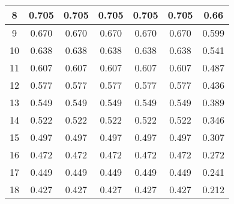 \begin{table}
\begin{tabular}{|l|l|l|l|l|l|l|}
\hline
\multicolumn{1}{|c|}{8} & \multicolumn{1}{c|}{0.705} & \multicolumn{1}{c|}{0.705} & \multicolumn{1}{c|}{0.705} & \multicolumn{1}{c|}{0.705} & \multicolumn{1}{c|}{0.705} & \multicolumn{1}{c|}{0.66} \\ 
\hline
\multicolumn{1}{|c|}{9} & \multicolumn{1}{c|}{0.670} & \multicolumn{1}{c|}{0.670} & \multicolumn{1}{c|}{0.670} & \multicolumn{1}{c|}{0.670} & \multicolumn{1}{c|}{0.670} & \multicolumn{1}{c|}{0.599} \\ 
\hline
\multicolumn{1}{|c|}{10} & \multicolumn{1}{c|}{0.638} & \multicolumn{1}{c|}{0.638} & \multicolumn{1}{c|}{0.638} & \multicolumn{1}{c|}{0.638} & \multicolumn{1}{c|}{0.638} & \multicolumn{1}{c|}{0.541} \\ 
\hline
\multicolumn{1}{|c|}{11} & \multicolumn{1}{c|}{0.607} & \multicolumn{1}{c|}{0.607} & \multicolumn{1}{c|}{0.607} & \multicolumn{1}{c|}{0.607} & \multicolumn{1}{c|}{0.607} & \multicolumn{1}{c|}{0.487} \\ 
\hline
\multicolumn{1}{|c|}{12} & \multicolumn{1}{c|}{0.577} & \multicolumn{1}{c|}{0.577} & \multicolumn{1}{c|}{0.577} & \multicolumn{1}{c|}{0.577} & \multicolumn{1}{c|}{0.577} & \multicolumn{1}{c|}{0.436} \\ 
\hline
\multicolumn{1}{|c|}{13} & \multicolumn{1}{c|}{0.549} & \multicolumn{1}{c|}{0.549} & \multicolumn{1}{c|}{0.549} & \multicolumn{1}{c|}{0.549} & \multicolumn{1}{c|}{0.549} & \multicolumn{1}{c|}{0.389} \\ 
\hline
\multicolumn{1}{|c|}{14} & \multicolumn{1}{c|}{0.522} & \multicolumn{1}{c|}{0.522} & \multicolumn{1}{c|}{0.522} & \multicolumn{1}{c|}{0.522} & \multicolumn{1}{c|}{0.522} & \multicolumn{1}{c|}{0.346} \\ 
\hline
\multicolumn{1}{|c|}{15} & \multicolumn{1}{c|}{0.497} & \multicolumn{1}{c|}{0.497} & \multicolumn{1}{c|}{0.497} & \multicolumn{1}{c|}{0.497} & \multicolumn{1}{c|}{0.497} & \multicolumn{1}{c|}{0.307} \\ 
\hline
\multicolumn{1}{|c|}{16} & \multicolumn{1}{c|}{0.472} & \multicolumn{1}{c|}{0.472} & \multicolumn{1}{c|}{0.472} & \multicolumn{1}{c|}{0.472} & \multicolumn{1}{c|}{0.472} & \multicolumn{1}{c|}{0.272} \\ 
\hline
\multicolumn{1}{|c|}{17} & \multicolumn{1}{c|}{0.449} & \multicolumn{1}{c|}{0.449} & \multicolumn{1}{c|}{0.449} & \multicolumn{1}{c|}{0.449} & \multicolumn{1}{c|}{0.449} & \multicolumn{1}{c|}{0.241} \\ 
\hline
\multicolumn{1}{|c|}{18} & \multicolumn{1}{c|}{0.427} & \multicolumn{1}{c|}{0.427} & \multicolumn{1}{c|}{0.427} & \multicolumn{1}{c|}{0.427} & \multicolumn{1}{c|}{0.427} & \multicolumn{1}{c|}{0.212} \\ 

\end{tabular}
\end{table}
